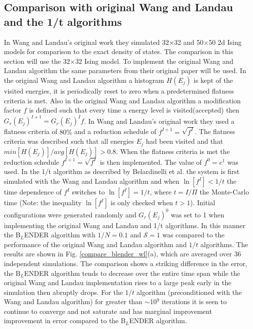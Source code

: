 \documentclass[aps,pre,reprint,superscriptaddress,showkeys]{revtex4-2}
\begin{document}
\subsection{Comparison with original Wang and Landau  and the 1/t algorithms}
In Wang and Landau's original work they simulated  32$\times$32 and 50$\times$50 2d Ising models for comparison to the exact density of states. The comparison in this section will use the 32$\times$32 Ising model. To implement the original Wang and Landau algorithm the same parameters from their original paper will be used\cite{WL_phys_rev_lett}. In the original Wang and Landau algorithm a histogram $H(E_j)$ is kept of the visited energies, it is periodically reset to zero when a predetermined flatness criteria is met. Also in the original Wang and Landau algorithm a  modification factor $f$ is defined such that every time a energy level is visited(accepted) then $G_r(E_j)^{I+1} = G_r(E_j)^{I}f$. In Wang and Landau's original work they used a flatness criteria of $80\%$ and a reduction schedule of $f^{I+1}= \sqrt{f^{I}}$. The flatness criteria was described such that all energies $E_j$ had been visited and that  $min[H(E_j)]/avg[H(E_j)] > 0.8$. When the flatness criteria is met the reduction schedule $f^{I+1}= \sqrt{f^{I}}$ is then implemented. The value of $f^0 = e^1$ was used. In the 1/t algorithm as described by Belardinelli et al. \cite{saturation} the system is first simulated with the Wang and Landau algorithm and when $\ln[f^I]< 1/t$  the time dependence of $f^I$ switches to $\ln[f^I]=1/t$, where $t = I/\Pi$ the Monte-Carlo time (Note: the inequality $\ln[f^I]$ is only checked when $t>1$).  Initial configurations were generated randomly and $G_r(E_j)^0$ was set to 1 when implementing the original Wang and Landau and  1/t algorithms.  In  this manner the B$_L$ENDER algorithm with $1/N = 0.1$ and $\mathcal{S}=1$ was compared to the performance of the original Wang and Landau algorithm and $1/t$ algorithms. The results are shown in Fig. \ref{compare_blender_wl}(a), which are averaged over 36 independent simulations. The comparison shows a striking difference in the error,  the B$_L$ENDER algorithm  tends to decrease over the entire time span while the original Wang and Landau implementation  rises to a large peak early in the simulation then abruptly drops. For the $1/t$ algorithm (preconditioned with the Wang and Landau algorithm) for greater than $\sim$10$^9$ iterations it is seen to continue to converge and not saturate and has marginal improvement improvement in error compared to the B$_L$ENDER algorithm.    
\end{document}

